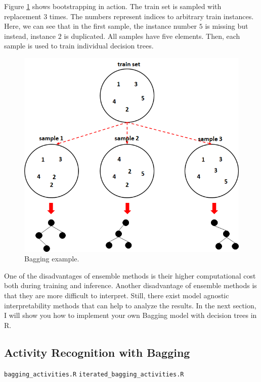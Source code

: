 \documentclass[
  11pt,
]{krantz}
\makeatletter
\newenvironment{kframe}{%
\medskip{}
\setlength{\fboxsep}{.8em}
 \def\at@end@of@kframe{}%
 \ifinner\ifhmode%
  \def\at@end@of@kframe{\end{minipage}}%
  \begin{minipage}{\columnwidth}%
 \fi\fi%
 \def\FrameCommand##1{\hskip\@totalleftmargin \hskip-\fboxsep
 \colorbox{shadecolor}{##1}\hskip-\fboxsep
     \hskip-\linewidth \hskip-\@totalleftmargin \hskip\columnwidth}%
 \MakeFramed {\advance\hsize-\width
   \@totalleftmargin\z@ \linewidth\hsize
   \@setminipage}}%
 {\par\unskip\endMakeFramed%
 \at@end@of@kframe}
\newenvironment{rmdblock}[1]
  {
  \begin{itemize}
  \renewcommand{\labelitemi}{
    \raisebox{-.7\height}[0pt][0pt]{
      {\setkeys{Gin}{width=3em,keepaspectratio}\texttt{[image: images/icons/\#1]}}
    }
  }
  \setlength{\fboxsep}{1em}
  \begin{kframe}
  \item
  }
  {
  \end{kframe}
  \end{itemize}
  }
\newenvironment{rmdfolder}
  {\begin{rmdblock}{folder}}
  {\end{rmdblock}}
\makeatother
\begin{document}
Figure \ref{fig:baggingexample} shows bootstrapping in action. The train set is sampled with replacement \(3\) times. The numbers represent indices to arbitrary train instances. Here, we can see that in the first sample, the instance number \(5\) is missing but instead, instance \(2\) is duplicated. All samples have five elements. Then, each sample is used to train individual decision trees.

\begin{figure}

{\centering \includegraphics[width=0.7\linewidth]{images/bagging} 

}

\caption{Bagging example.}\label{fig:baggingexample}
\end{figure}

One of the disadvantages of ensemble methods is their higher computational cost both during training and inference. Another disadvantage of ensemble methods is that they are more difficult to interpret. Still, there exist model agnostic interpretability methods \citep{molnarInterpretable} that can help to analyze the results. In the next section, I will show you how to implement your own Bagging model with decision trees in R.

\hypertarget{activity-recognition-with-bagging}{%
\subsection{Activity Recognition with Bagging}\label{activity-recognition-with-bagging}}

\begin{rmdfolder}
\texttt{bagging\_activities.R} \texttt{iterated\_bagging\_activities.R}
\end{rmdfolder}
\end{document}
